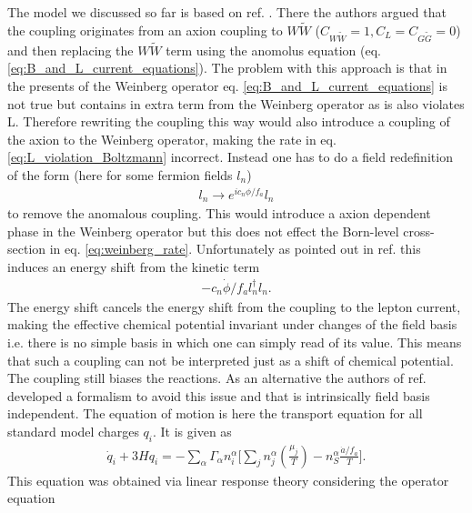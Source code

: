 \documentclass[13pt,a4paper,titlepage]{article}
\begin{document}
The model we discussed so far is based on ref. \cite{Axion_leptogenesis_Kusenko_2015}.
There the authors argued that the coupling originates from an axion coupling to $W \tilde{W}$ ($C_{W \tilde{W}} = 1, C_L = C_{G \tilde{G}} = 0$) and then replacing the $W \tilde{W}$ term using
the anomolus equation (eq. \eqref{eq:B_and_L_current_equations}).
The problem with this approach is that in the presents of the Weinberg operator eq. \eqref{eq:B_and_L_current_equations} is not true but contains in extra term from the Weinberg operator as
is also violates L. Therefore rewriting the coupling this way would also introduce a coupling of
the axion to the Weinberg operator, making the rate in eq. \eqref{eq:L_violation_Boltzmann} incorrect.
Instead one has to do a field redefinition of the form (here for some fermion fields $l_n$)
\begin{align}
    l_n \to e^{i c_n \phi / f_a} l_n
\end{align}
to remove the anomalous coupling. This would introduce a axion dependent phase in the Weinberg operator
but this does not effect the Born-level cross-section in eq. \eqref{eq:weinberg_rate}.
Unfortunately as pointed out in ref. \cite{Shi_2015_Basis_Invariance_chemical_equilibrium} this induces an energy shift from the kinetic term \cite[eq. 6]{Shi_2015_Basis_Invariance_chemical_equilibrium}
\begin{align}
    - c_n \dot{\phi} / {f_a} l_n^{\dagger} l_n.
\end{align}
The energy shift cancels the energy shift from the coupling to the lepton current, making the effective
chemical potential invariant under changes of the field basis i.e. there is no simple basis in which
one can simply read of its value.
This means that such a coupling can not be interpreted just as a shift of chemical potential.
The coupling still biases the reactions.
As an alternative the authors of ref. \cite{Domcke:2020kcp_Generic_Couplings} developed a formalism
to avoid this issue and that is intrinsically field basis independent.
The equation of motion is here the transport equation for all standard model charges $q_i$.
It is
given as \cite[eq. 3.4]{Domcke:2020kcp_Generic_Couplings}
\begin{align}
\label{eq:transport_equation}
\dot{q}_i + 3 H q_i = - \sum_\alpha \Gamma_\alpha n^\alpha_i \Big[
\sum_j n^\alpha_j \left( \frac{\mu_j}{T} \right) - n_S^\alpha \frac{\dot{a} / f_a}{T} \Big].
\end{align}
This equation was obtained via linear response theory considering the operator equation \cite[eq. 2.1]{Domcke:2020kcp_Generic_Couplings}
\end{document}
